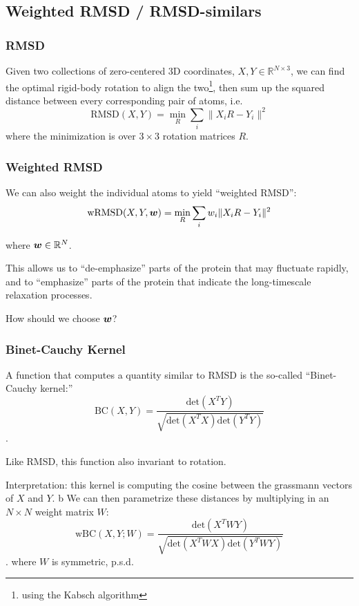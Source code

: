 \documentclass[aps,prl,preprint,nofootinbib,superscriptaddress,linenumbers]{revtex4-1}
\newcommand{\bfv}[1]{{\mbox{\boldmath{$#1$}}}}
\begin{document}
\subsection{Weighted RMSD / RMSD-similars}
\subsubsection{RMSD}
Given two collections of zero-centered 3D coordinates, $X,Y \in \mathbb{R}^{N \times 3}$, we can find the optimal rigid-body rotation to align the two\footnote{using the Kabsch algorithm}, then sum up the squared distance between every corresponding pair of atoms, i.e.
$$ \text{RMSD}(X,Y) = \min_R \sum_i \| X_i R - Y_i \|^2 $$
where the minimization is over $3 \times 3$ rotation matrices $R$.

\subsubsection{Weighted RMSD}
We can also weight the individual atoms to yield ``weighted RMSD'':
$$ \text{wRMSD}(X,Y,\bfv{w}) = \min_R \sum_i w_i \| X_i R - Y_i \|^2 $$

where $ \bfv{w} \in \mathbb{R}^N$.

This allows us to ``de-emphasize'' parts of the protein that may fluctuate rapidly, and to ``emphasize'' parts of the protein that indicate the long-timescale relaxation processes.

How should we choose $\bfv{w}$?

\subsubsection{Binet-Cauchy Kernel}
A function that computes a quantity similar to RMSD is the so-called ``Binet-Cauchy kernel:''
$$ \text{BC}(X,Y) = \frac{\text{det}(X^T Y)}{\sqrt{\text{det}(X^T X) \text{det}(Y^T Y)}} $$.

Like RMSD, this function also invariant to rotation.

Interpretation: this kernel is computing the cosine between the grassmann vectors of $X$ and $Y$.
b
We can then parametrize these distances by multiplying in an $N\times N$ weight matrix $W$:
$$ \text{wBC}(X,Y; W) = \frac{\text{det}(X^T W Y)}{\sqrt{\text{det}(X^T W X) \text{det}(Y^T W Y)}} $$.
where $W$ is symmetric, p.s.d.
\end{document}
